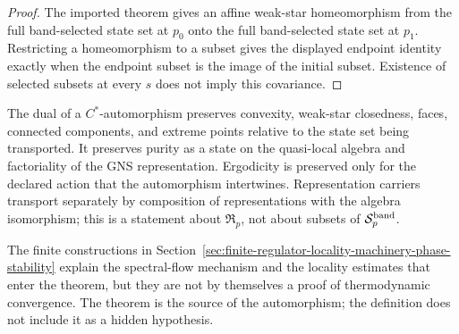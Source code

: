 \begin{proof}
The imported theorem gives an affine weak-star homeomorphism from the full
band-selected state set at \(p_0\) onto the full band-selected state set at
\(p_1\).  Restricting a homeomorphism to a subset gives the displayed endpoint
identity exactly when the endpoint subset is the image of the initial subset.
Existence of selected subsets at every \(s\) does not imply this covariance.
\end{proof}

The dual of a \(C^*\)-automorphism preserves convexity, weak-star closedness,
faces, connected components, and extreme points relative to the state set being
transported.  It preserves purity as a state on the quasi-local algebra and
factoriality of the GNS representation.  Ergodicity is preserved only for the
declared action that the automorphism intertwines.  Representation carriers
transport separately by composition of representations with the algebra
isomorphism; this is a statement about \(\mathfrak R_p\), not about subsets
of \(\mathcal S_p^{\rm band}\).

The finite constructions in
Section~\ref{sec:finite-regulator-locality-machinery-phase-stability} explain
the spectral-flow mechanism and the locality estimates that enter the
theorem, but they are not by themselves a proof of thermodynamic convergence.
The theorem is the source of the automorphism; the definition does not include
it as a hidden hypothesis.

